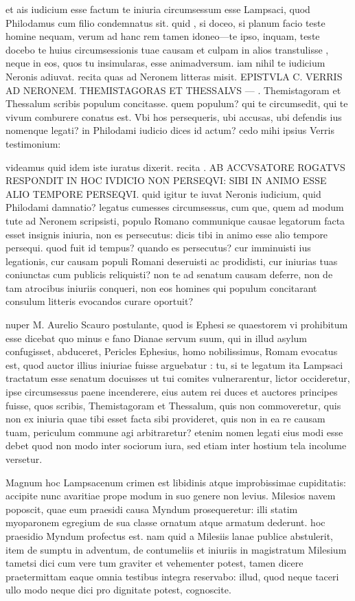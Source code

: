  et ais iudicium esse factum te iniuria circumsessum esse Lampsaci, quod Philodamus cum filio condemnatus sit. quid , si doceo, si planum facio teste homine nequam, verum ad hanc rem tamen idoneo—te ipso, inquam, teste docebo te huius circumsessionis tuae causam et culpam in alios transtulisse , neque in eos, quos tu insimularas, esse animadversum. iam nihil te iudicium Neronis adiuvat. recita quas ad Neronem litteras misit. EPISTVLA C. VERRIS AD NERONEM. THEMISTAGORAS ET THESSALVS — . Themistagoram et Thessalum scribis populum concitasse. quem populum? qui te circumsedit, qui te vivum comburere conatus est. Vbi hos persequeris, ubi accusas, ubi defendis ius nomenque legati? in Philodami iudicio dices id actum? cedo mihi ipsius Verris testimonium:

 videamus quid idem iste iuratus dixerit. recita . AB ACCVSATORE ROGATVS RESPONDIT IN HOC IVDICIO NON PERSEQVI: SIBI IN ANIMO ESSE ALIO TEMPORE PERSEQVI. quid igitur te iuvat Neronis iudicium, quid Philodami damnatio? legatus cumesses circumsessus, cum que, quem ad modum tute ad Neronem scripsisti, populo Romano communique causae legatorum facta esset insignis iniuria, non es persecutus: dicis tibi in animo esse alio tempore persequi. quod fuit id tempus? quando es persecutus? cur imminuisti ius legationis, cur causam populi Romani deseruisti ac prodidisti, cur iniurias tuas coniunctas cum publicis reliquisti? non te ad senatum causam deferre, non de tam atrocibus iniuriis conqueri, non eos homines qui populum concitarant consulum litteris evocandos curare oportuit?

 nuper M. Aurelio Scauro postulante, quod is Ephesi se quaestorem vi prohibitum esse dicebat quo minus e fano Dianae servum suum, qui in illud asylum confugisset, abduceret, Pericles Ephesius, homo nobilissimus, Romam evocatus est, quod auctor illius iniuriae fuisse arguebatur : tu, si te legatum ita Lampsaci tractatum esse senatum docuisses ut tui comites vulnerarentur, lictor occideretur, ipse circumsessus paene incenderere, eius autem rei duces et auctores principes fuisse, quos scribis, Themistagoram et Thessalum, quis non commoveretur, quis non ex iniuria quae tibi esset facta sibi provideret, quis non in ea re causam tuam, periculum commune agi arbitraretur? etenim nomen legati eius modi esse debet quod non modo inter sociorum iura, sed etiam inter hostium tela incolume versetur.

 Magnum hoc Lampsacenum crimen est libidinis atque improbissimae cupiditatis: accipite nunc avaritiae prope modum in suo genere non levius. Milesios navem poposcit, quae eum praesidi causa Myndum prosequeretur: illi statim myoparonem egregium de sua classe ornatum atque armatum dederunt. hoc praesidio Myndum profectus est. nam quid a Milesiis lanae publice abstulerit, item de sumptu in adventum, de contumeliis et iniuriis in magistratum Milesium tametsi dici cum vere tum graviter et vehementer potest, tamen dicere praetermittam eaque omnia testibus integra reservabo: illud, quod neque taceri ullo modo neque dici pro dignitate potest, cognoscite.

